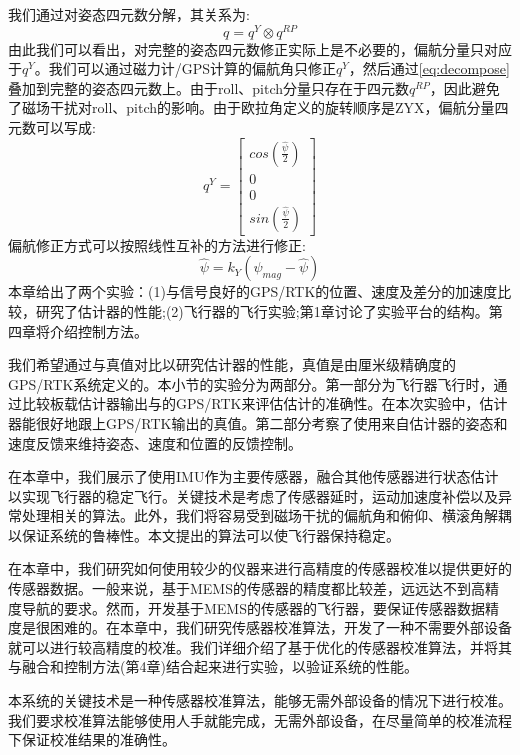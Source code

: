 \documentclass[
  type=master
]{gdutthesis}
\begin{document}
我们通过对姿态四元数分解，其关系为:
\begin{equation}\label{eq:decompose}
	q = q^{Y} \otimes q^{RP}	
\end{equation}
由此我们可以看出，对完整的姿态四元数修正实际上是不必要的，偏航分量只对应于$q^{Y}$。我们可以通过磁力计/GPS计算的偏航角只修正$q^{Y}$，然后通过\autoref{eq:decompose}叠加到完整的姿态四元数上。由于roll、pitch分量只存在于四元数$q^{RP}$，因此避免了磁场干扰对roll、pitch的影响。由于欧拉角定义的旋转顺序是ZYX，偏航分量四元数可以写成:
\begin{equation}
	q^{Y} = 
	\begin{bmatrix}
		cos(\frac{\hat{\psi}}{2}) \\
		0 \\
		0 \\
		sin(\frac{\hat{\psi}}{2})
	\end{bmatrix}	
\end{equation}
偏航修正方式可以按照线性互补的方法进行修正:
\begin{equation}
	\hat{\psi} = k_Y (\psi_{mag} - \hat{\psi}) 	
\end{equation}
本章给出了两个实验：(1)与信号良好的GPS/RTK的位置、速度及差分的加速度比较，研究了估计器的性能;(2)飞行器的飞行实验;第1章讨论了实验平台的结构。第四章将介绍控制方法。

我们希望通过与真值对比以研究估计器的性能，真值是由厘米级精确度的GPS/RTK系统定义的。本小节的实验分为两部分。第一部分为飞行器飞行时，通过比较板载估计器输出与的GPS/RTK来评估估计的准确性。在本次实验中，估计器能很好地跟上GPS/RTK输出的真值。第二部分考察了使用来自估计器的姿态和速度反馈来维持姿态、速度和位置的反馈控制。


在本章中，我们展示了使用IMU作为主要传感器，融合其他传感器进行状态估计以实现飞行器的稳定飞行。关键技术是考虑了传感器延时，运动加速度补偿以及异常处理相关的算法。此外，我们将容易受到磁场干扰的偏航角和俯仰、横滚角解耦以保证系统的鲁棒性。本文提出的算法可以使飞行器保持稳定。

在本章中，我们研究如何使用较少的仪器来进行高精度的传感器校准以提供更好的传感器数据。一般来说，基于MEMS的传感器的精度都比较差，远远达不到高精度导航的要求。然而，开发基于MEMS的传感器的飞行器，要保证传感器数据精度是很困难的。在本章中，我们研究传感器校准算法，开发了一种不需要外部设备就可以进行较高精度的校准。我们详细介绍了基于优化的传感器校准算法，并将其与融合和控制方法(第4章)结合起来进行实验，以验证系统的性能。\par
本系统的关键技术是一种传感器校准算法，能够无需外部设备的情况下进行校准。我们要求校准算法能够使用人手就能完成，无需外部设备，在尽量简单的校准流程下保证校准结果的准确性。\par
\end{document}
